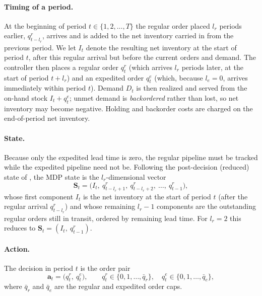\documentclass[11pt]{article}
\begin{document}
\paragraph{Timing of a period.}
At the beginning of period $t\in\{1,2,\dots,T\}$ the regular order placed $l_r$ periods earlier,
$q^r_{t-l_r}$, arrives and is added to the net inventory carried in from the previous period. We let
$I_t$ denote the resulting net inventory at the start of period $t$, after this regular arrival but
before the current orders and demand. The controller then places a regular order $q^r_t$ (which
arrives $l_r$ periods later, at the start of period $t+l_r$) and an expedited order $q^e_t$ (which,
because $l_e=0$, arrives immediately within period $t$). Demand $D_t$ is then realized and served
from the on-hand stock $I_t+q^e_t$; unmet demand is \emph{backordered} rather than lost, so net
inventory may become negative. Holding and backorder costs are charged on the end-of-period net
inventory.

\paragraph{State.}
Because only the expedited lead time is zero, the regular pipeline must be tracked while the
expedited pipeline need not be. Following the post-decision (reduced) state of
\citet{gijsbrechts2022drl}, the MDP state is the $l_r$-dimensional vector
\begin{equation*}
    \mathbf{S}_t=\bigl(I_t,\ q^r_{t-l_r+1},\ q^r_{t-l_r+2},\ \dots,\ q^r_{t-1}\bigr),
\end{equation*}
whose first component $I_t$ is the net inventory at the start of period $t$ (after the regular
arrival $q^r_{t-l_r}$) and whose remaining $l_r-1$ components are the outstanding regular orders
still in transit, ordered by remaining lead time. For $l_r=2$ this reduces to
$\mathbf{S}_t=(I_t,\ q^r_{t-1})$.

\paragraph{Action.}
The decision in period $t$ is the order pair
\begin{equation*}
    \mathbf{a}_t=\bigl(q^r_t,\ q^e_t\bigr),\qquad
    q^r_t\in\{0,1,\dots,\bar q_r\},\quad q^e_t\in\{0,1,\dots,\bar q_e\},
\end{equation*}
where $\bar q_r$ and $\bar q_e$ are the regular and expedited order caps.
\end{document}
